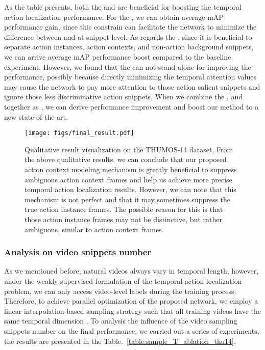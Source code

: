 \documentclass[journal,comsoc]{IEEEtran}
\begin{document}
\par As the table presents, both the  and  are beneficial for boosting the temporal action localization performance. For the , we can obtain  average mAP performance gain, since this constrain can facilitate the network to minimize the difference between  and  at snippet-level.
As regards the , since it is beneficial to separate action instances, action contexts, and non-action background snippets, we can arrive  average mAP performance boost compared to the baseline experiment. However, we found that the  can not stand alone for improving the performance, possibly because directly minimizing the temporal attention values may cause the network to pay more attention to those action salient snippets and ignore those less discriminative action snippets. When we combine the ,  and  together as , we can derive  performance improvement and boost our method to a  new state-of-the-art. 

\begin{figure*}[!h]
	\centering
    \texttt{[image: figs/final\_result.pdf]}
	\caption{Qualitative result visualization on the THUMOS-14 dataset. From the above qualitative results, we can conclude that our proposed action context modeling mechanism is greatly beneficial to suppress ambiguous action context frames and help us achieve more precise temporal action localization results. However, we can note that this mechanism is not perfect and that it may sometimes suppress the true action instance frames. The possible reason for this is that those action instance frames may not be distinctive, but rather ambiguous, similar to action context frames.}
	\label{fig:qualitative_result}
\end{figure*}

\subsubsection{Analysis on video snippets number }

\par As we mentioned before, natural videos always vary in temporal length, however, under the weakly supervised formulation of the temporal action localization problem, we can only access video-level labels during the training process. Therefore, to achieve parallel optimization of the proposed network, we employ a linear interpolation-based sampling strategy such that all training videos have the same temporal dimension . To analysis the influence of the video sampling snippets number  on the final performance, we carried out a series of experiments, the results are presented in the Table.~\ref{table:sample_T_ablation_thu14}. 
\end{document}
